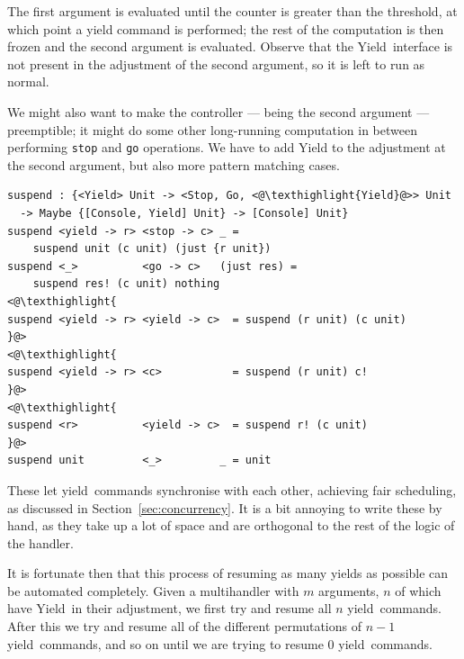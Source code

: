 \documentclass[msc,deptreport,cs]{infthesis} %
\newcommand{\code}[1]{\lstinline{#1}}
\newcommand{\texthighlight}[1]{%
  \colorbox{red!20}{#1}}
\newcommand\yield{\textsf{yield}\xspace}
\newcommand\Yield{\textsf{Yield}\xspace}
\begin{document}
The first argument is evaluated until the counter is greater than the threshold,
at which point a yield command is performed; the rest of the computation is then
frozen and the second argument is evaluated. Observe that the \Yield~interface
is not present in the adjustment of the second argument, so it is left to run
as normal.

We might also want to make the controller --- being the second argument ---
preemptible; it might do some other long-running computation in between
performing \code{stop} and \code{go} operations. We have to add \Yield to the
adjustment at the second argument, but also more pattern matching cases.

\begin{lstlisting}[]
suspend : {<Yield> Unit -> <Stop, Go, <@\texthighlight{Yield}@>> Unit
  -> Maybe {[Console, Yield] Unit} -> [Console] Unit}
suspend <yield -> r> <stop -> c> _ =
    suspend unit (c unit) (just {r unit})
suspend <_>          <go -> c>   (just res) =
    suspend res! (c unit) nothing
<@\texthighlight{
suspend <yield -> r> <yield -> c>  = suspend (r unit) (c unit)
}@>
<@\texthighlight{
suspend <yield -> r> <c>           = suspend (r unit) c!
}@>
<@\texthighlight{
suspend <r>          <yield -> c>  = suspend r! (c unit)
}@>
suspend unit         <_>         _ = unit
\end{lstlisting}

These let \yield~commands synchronise with each other, achieving fair scheduling,
as discussed in Section~\ref{sec:concurrency}. It is a bit annoying to write
these by hand, as they take up a lot of space and are orthogonal to the rest of
the logic of the handler.

It is fortunate then that this process of resuming as many yields as possible
can be automated completely. Given a multihandler with $m$ arguments, $n$ of
which have \Yield~in their adjustment, we first try and resume all $n$
\yield~commands. After this we try and resume all of the different permutations
of $n-1$ \yield~commands, and so on until we are trying to resume 0
\yield~commands.
%


\end{document}
